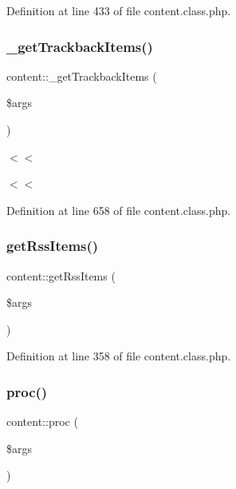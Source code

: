 Definition at line 433 of file content.\+class.\+php.

\hypertarget{classcontent_a4cdf2e0d2ede8a8bca1c61526f920adc}{}\label{classcontent_a4cdf2e0d2ede8a8bca1c61526f920adc} 
\subsubsection{\texorpdfstring{\+\_\+get\+Trackback\+Items()}{\_getTrackbackItems()}}
{\footnotesize\ttfamily content\+::\+\_\+get\+Trackback\+Items (\begin{DoxyParamCaption}\item[{}]{\$args }\end{DoxyParamCaption})}

$<$$<$

$<$$<$ 

Definition at line 658 of file content.\+class.\+php.

\hypertarget{classcontent_a78e600f4e35fe539b4ae34218d702e04}{}\label{classcontent_a78e600f4e35fe539b4ae34218d702e04} 
\subsubsection{\texorpdfstring{get\+Rss\+Items()}{getRssItems()}}
{\footnotesize\ttfamily content\+::get\+Rss\+Items (\begin{DoxyParamCaption}\item[{}]{\$args }\end{DoxyParamCaption})}



Definition at line 358 of file content.\+class.\+php.

\hypertarget{classcontent_aacac5eb20ef4b64552d77bd5d2e2bf99}{}\label{classcontent_aacac5eb20ef4b64552d77bd5d2e2bf99} 
\subsubsection{\texorpdfstring{proc()}{proc()}}
{\footnotesize\ttfamily content\+::proc (\begin{DoxyParamCaption}\item[{}]{\$args }\end{DoxyParamCaption})}



